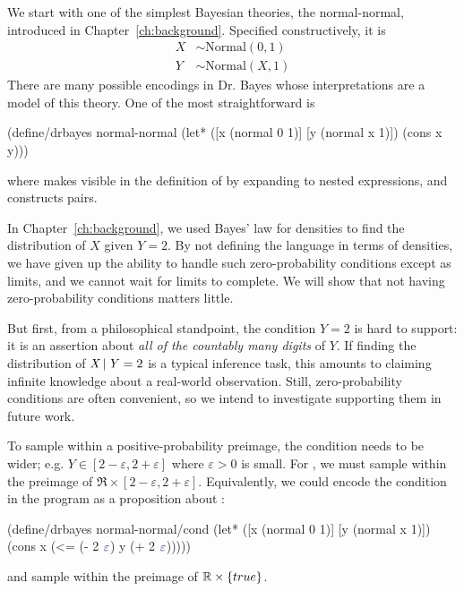We start with one of the simplest Bayesian theories, the normal-normal, introduced in Chapter~\ref{ch:background}.
Specified constructively, it is
\begin{equation}
\begin{aligned}
	X &\sim \mathrm{Normal}(0,1) \\
	Y &\sim \mathrm{Normal}(X,1)
\end{aligned}
\end{equation}
There are many possible encodings in Dr. Bayes whose interpretations are a model of this theory.
One of the most straightforward is
\begin{center}\singlespacing
\begin{schemedisplay}
(define/drbayes normal-normal
  (let* ([x  (normal 0 1)]
         [y  (normal x 1)])
    (cons x y)))
\end{schemedisplay}
\end{center}
where  makes  visible in the definition of  by expanding to nested  expressions, and  constructs pairs.

In Chapter~\ref{ch:background}, we used Bayes' law for densities to find the distribution of $\mathit{X}$ given $\mathit{Y} = 2$.
By not defining the language in terms of densities, we have given up the ability to handle such zero-probability conditions except as limits, and we cannot wait for limits to complete.
We will show that not having zero-probability conditions matters little.

But first, from a philosophical standpoint, the condition $\mathit{Y} = 2$ is hard to support: it is an assertion about \emph{all of the countably many digits} of $\mathit{Y}$.
If finding the distribution of $\mathit{X} \,|\, \mathit{Y} = 2$ is a typical inference task, this amounts to claiming infinite knowledge about a real-world observation.
Still, zero-probability conditions are often convenient, so we intend to investigate supporting them in future work.

To sample within a positive-probability preimage, the condition needs to be wider; e.g. $\mathit{Y} \in [2-\varepsilon,2+\varepsilon]$ where $\varepsilon > 0$ is small.
For , we must sample within the preimage of $\Re \times [2-\varepsilon,2+\varepsilon]$.
Equivalently, we could encode the condition in the program as a proposition about :
\begin{center}\singlespacing
\begin{schemedisplay}
(define/drbayes normal-normal/cond
  (let* ([x  (normal 0 1)]
         [y  (normal x 1)])
    (cons x (<= (- 2 $\va{\varepsilon}$) y (+ 2 $\va{\varepsilon}$)))))
\end{schemedisplay}
\end{center}
and sample within the preimage of $\mathbb{R} \times \{{true}\}$.


